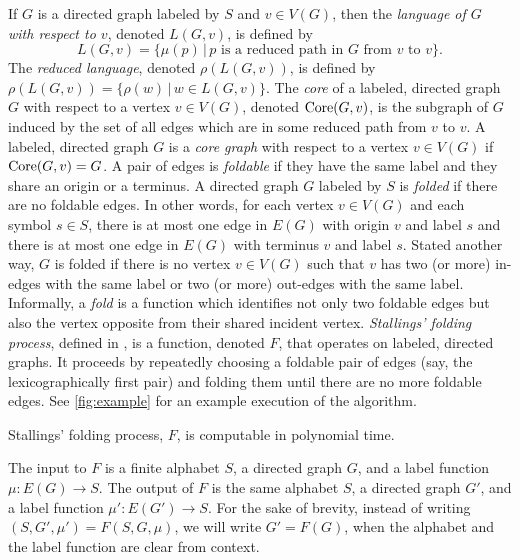 \documentclass{article}
\newcommand{\Core}{\textnormal{Core}}
\begin{document}
If $G$ is a directed graph labeled by $S$ and $v \in V(G)$, then the \emph{language of $G$ with respect to $v$}, denoted $L(G, v)$, is defined by
\begin{equation*}
  L(G, v) = \{ \mu(p) \, | \, p \text{ is a reduced path in } G \text{ from } v \text{ to } v\}.
\end{equation*}
The \emph{reduced language}, denoted $\rho(L(G, v))$, is defined by $\rho(L(G, v)) = \{ \rho(w) \, | \, w \in L(G, v) \}$.
The \emph{core} of a labeled, directed graph $G$ with respect to a vertex $v \in V(G)$, denoted $\Core(G, v)$, is the subgraph of $G$ induced by the set of all edges which are in some reduced path from $v$ to $v$.
A labeled, directed graph $G$ is a \emph{core graph} with respect to a vertex $v \in V(G)$ if $\Core(G, v) = G$.
A pair of edges is \emph{foldable} if they have the same label and they share an origin or a terminus.
A directed graph $G$ labeled by $S$ is \emph{folded} if there are no foldable edges.
In other words, for each vertex $v \in V(G)$ and each symbol $s \in S$, there is at most one edge in $E(G)$ with origin $v$ and label $s$ and there is at most one edge in $E(G)$ with terminus $v$ and label $s$.
Stated another way, $G$ is folded if there is no vertex $v \in V(G)$ such that $v$ has two (or more) in-edges with the same label or two (or more) out-edges with the same label.
Informally, a \emph{fold} is a function which identifies not only two foldable edges but also the vertex opposite from their shared incident vertex.
\emph{Stallings' folding process}, defined in \autocite[Algorithm~5.4]{stallings83}, is a function, denoted $F$, that operates on labeled, directed graphs.
It proceeds by repeatedly choosing a foldable pair of edges (say, the lexicographically first pair) and folding them until there are no more foldable edges.
See \autoref{fig:example} for an example execution of the algorithm.



\begin{theorem}\label{thm:finfp}
  Stallings' folding process, $F$, is computable in polynomial time.
\end{theorem}

The input to $F$ is a finite alphabet $S$, a directed graph $G$, and a label function $\mu \colon E(G) \to S$.
The output of $F$ is the same alphabet $S$, a directed graph $G'$, and a label function $\mu' \colon E(G') \to S$.
For the sake of brevity, instead of writing $(S, G', \mu') = F(S, G, \mu)$, we will write $G' = F(G)$, when the alphabet and the label function are clear from context.
\end{document}
